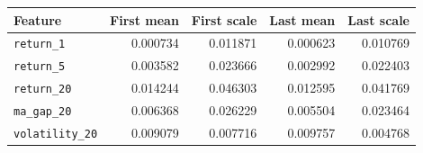 \begin{tabular}{lrrrr}
\toprule
Feature & First mean & First scale & Last mean & Last scale \\
\midrule
\texttt{return\_1} & 0.000734 & 0.011871 & 0.000623 & 0.010769 \\
\texttt{return\_5} & 0.003582 & 0.023666 & 0.002992 & 0.022403 \\
\texttt{return\_20} & 0.014244 & 0.046303 & 0.012595 & 0.041769 \\
\texttt{ma\_gap\_20} & 0.006368 & 0.026229 & 0.005504 & 0.023464 \\
\texttt{volatility\_20} & 0.009079 & 0.007716 & 0.009757 & 0.004768 \\
\bottomrule
\end{tabular}
